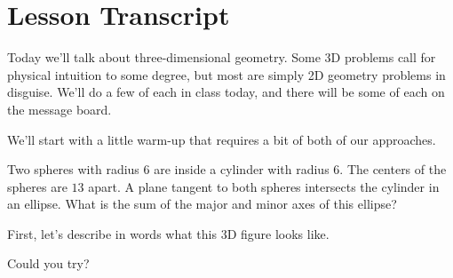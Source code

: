 \section{Lesson Transcript}












Today we'll talk about three-dimensional geometry. Some 3D problems call for physical intuition to some degree, but most are simply 2D geometry problems in disguise. We'll do a few of each in class today, and there will be some of each on the message board.

We'll start with a little warm-up that requires a bit of both of our approaches.

\begin{example}    
Two spheres with radius $6$ are inside a cylinder with radius $6.$ The centers of the spheres are $13$ apart. A plane tangent to both spheres intersects the cylinder in an ellipse. What is the sum of the major and minor axes of this ellipse?
\end{example}

First, let's describe in words what this 3D figure looks like.

Could you try?

